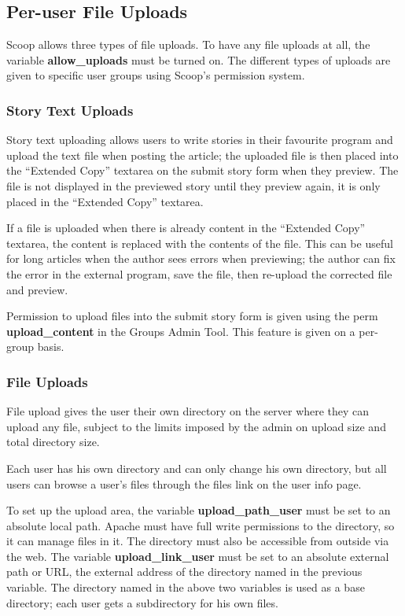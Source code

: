 \subsection{Per-user File Uploads}
\label{features-file-uploads}

Scoop allows three types of file uploads.  To have any file uploads at all, the variable {\bf allow\_uploads} must be turned on. The different types of uploads are given to specific user groups using Scoop's permission system.

\subsubsection{Story Text Uploads}

Story text uploading allows users to write stories in their favourite program and upload the text file when posting the article; the uploaded file is then placed into the ``Extended Copy'' textarea on the submit story form when they preview. The file is not displayed in the previewed story until they preview again, it is only placed in the ``Extended Copy'' textarea.

If a file is uploaded when there is already content in the ``Extended Copy'' textarea, the content is replaced with the contents of the file. This can be useful for long articles when the author sees errors when previewing; the author can fix the error in the external program, save the file, then re-upload the corrected file and preview.

Permission to upload files into the submit story form is given using the perm {\bf upload\_content} in the Groups Admin Tool. This feature is given on a per-group basis.

\subsubsection{File Uploads}

File upload gives the user their own directory on the server where they can upload any file, subject to the limits imposed by the admin on upload size and total directory size.

Each user has his own directory and can only change his own directory, but all users can browse a user's files through the files link on the user info page.

To set up the upload area, the variable {\bf upload\_path\_user} must be set to an absolute local path. Apache must have full write permissions to the directory, so it can manage files in it. The directory must also be accessible from outside via the web. The variable {\bf upload\_link\_user} must be set to an absolute external path or URL, the external address of the directory named in the previous variable. The directory named in the above two variables is used as a base directory; each user gets a subdirectory for his own files.

